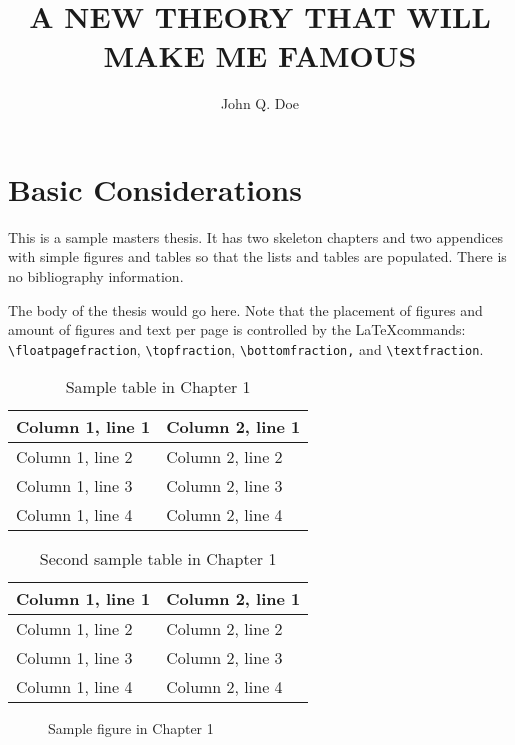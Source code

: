 \documentclass[dvips,11pt,twoside]{report}
\title{A NEW THEORY THAT WILL MAKE ME FAMOUS}
\author{John Q. Doe}
\begin{document}
\makefrontmatter

\chapter{Basic Considerations}

This is a sample masters thesis.  It has two skeleton chapters and two
appendices with simple figures and tables so that the lists and tables are
populated.  There is no bibliography information.

The body of the thesis would go here.  Note that the placement of figures and
amount of figures and text per page is controlled by the \LaTeX commands:
\verb+\floatpagefraction+, \verb+\topfraction+, \verb+\bottomfraction,+ and 
\verb+\textfraction+.

\begin{table} \caption{Sample table in Chapter 1} \begin{center}
\begin{tabular}{|l|l|} \hline
Column 1, line 1 & Column 2, line 1 \\ \hline
Column 1, line 2 & Column 2, line 2 \\ \hline
Column 1, line 3 & Column 2, line 3 \\ \hline
Column 1, line 4 & Column 2, line 4 \\ \hline
\end{tabular} \end{center} \end{table}

\begin{table} \caption{Second sample table in Chapter 1} \begin{center}
\begin{tabular}{|l|l|} \hline
Column 1, line 1 & Column 2, line 1 \\ \hline
Column 1, line 2 & Column 2, line 2 \\ \hline
Column 1, line 3 & Column 2, line 3 \\ \hline
Column 1, line 4 & Column 2, line 4 \\ \hline
\end{tabular} \end{center} \end{table}

\begin{figure} \caption{Sample figure in Chapter 1} \begin{center}
\end{center} \end{figure}
\end{document}
